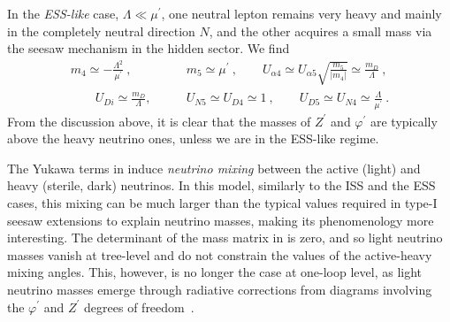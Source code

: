 In the \textit{ESS-like} case, $\Lambda \ll \mu^\prime$, one neutral lepton remains very heavy and mainly in the completely neutral direction $N$, and the other acquires a small mass via the seesaw mechanism in the hidden sector. We find
%
\begin{align}
m_4 \simeq -\frac{ \Lambda^2}{\mu^\prime}~, & \qquad  m_5 \simeq \mu^\prime ~, \qquad U_{\alpha 4} \simeq U_{\alpha 5}\sqrt{\frac{m_5}{\left|m_4\right|}}  \simeq  \frac{m_D}{\Lambda}~,\nonumber \\ \qquad U_{D i} \simeq \frac{m_D}{\Lambda},  &\qquad  U_{N5} \simeq U_{D4} \simeq 1 ~, \qquad  U_{D5} \simeq U_{N4} \simeq \frac{\Lambda}{\mu^\prime} ~.
\end{align}
%
From the discussion above, it is clear that the masses of $Z^\prime$ and $\varphi^\prime$ are typically above the heavy neutrino ones, unless we are in the ESS-like regime.

The Yukawa terms in  induce {\em neutrino mixing} between the active (light) and heavy (sterile, dark) neutrinos. In this model, similarly to the ISS and the ESS cases, this mixing can be much larger than the typical values required in type-I seesaw extensions to explain neutrino masses, making its phenomenology more interesting. The determinant of the mass matrix in  is zero, and so light neutrino masses vanish at tree-level and do not constrain the values of the active-heavy mixing angles. This, however, is no longer the case at one-loop level, as light neutrino masses emerge through radiative corrections from diagrams involving the $\varphi^\prime$ and $Z^\prime$ degrees of freedom~\cite{Ballett:2019cqp}.  


